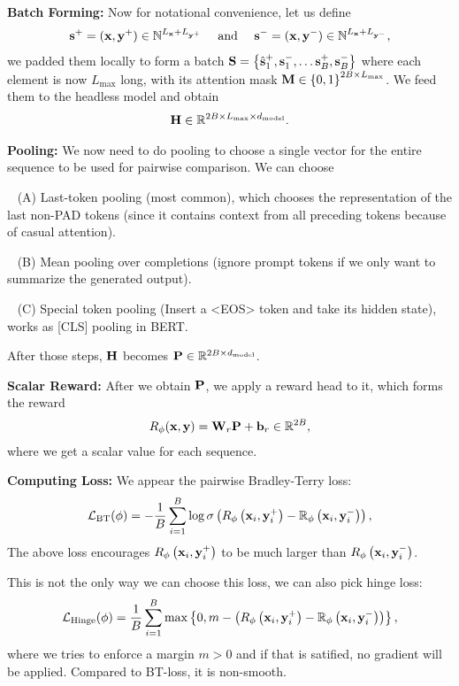 \documentclass[11pt]{article}  %
\begin{document}
\textbf{Batch Forming:} Now for notational convenience, let us define 
\begin{align*}
  \mathbf{s}^+ = (\mathbf{x}, \mathbf{y}^+) \in \mathbb{N}^{L_{\mathbf{x}} + L_{\mathbf{y}^+}} \quad \text{ and } \quad \mathbf{s}^- = (\mathbf{x}, \mathbf{y}^-) \in \mathbb{N}^{L_{\mathbf{x}} + L_{\mathbf{y}^-}},
\end{align*}
we padded them locally to form a batch $\mathbf{S} = \left\{ \hat{\mathbf{s}}_1^+, {\mathbf{s}}_1^-, \hdots {\mathbf{s}}_B^+, {\mathbf{s}}_B^- \right\}$ where each element is now $L_{\max}$ long, with its attention mask $\mathbf{M} \in \left\{ 0, 1 \right\}^{2B \times L_{\max}}$.
We feed them to the headless model and obtain 
\begin{align*}
  \mathbf{H} \in \mathbb{R}^{2B \times L_{\max} \times d_{\text{model}}}.
\end{align*}

\textbf{Pooling:} We now need to do pooling to choose a single vector for the entire sequence to be used for pairwise comparison. 
We can choose 

\textbullet~ (A) Last-token pooling (most common), which chooses the representation of the last non-PAD tokens (since it contains context from all preceding tokens because of casual attention). 

\textbullet~ (B) Mean pooling over completions (ignore prompt tokens if we only want to summarize the generated output).

\textbullet~ (C) Special token pooling (Insert a <EOS> token and take its hidden state), works as [CLS] pooling in BERT.

After those steps, $\mathbf{H}$ becomes $\mathbf{P} \in \mathbb{R}^{2B \times d_{\text{model}}}$.

\textbf{Scalar Reward:} After we obtain $\mathbf{P}$, we apply a reward head to it, which forms the reward 
\begin{align*}
  R_{\phi}(\mathbf{x}, \mathbf{y}) = \mathbf{W}_r \mathbf{P} + \mathbf{b}_r \in \mathbb{R}^{2B},
\end{align*}
where we get a scalar value for each sequence.

\textbf{Computing Loss:} We appear the pairwise Bradley-Terry loss: 
\begin{align*}
  \mathcal{L}_{\text{BT}}(\phi) = -\frac{1}{B}\sum_{i=1}^{B}\log \sigma\left( R_{\phi}\left( \mathbf{x}_i, \mathbf{y}_i^+ \right) - \mathbb{R}_\phi\left( \mathbf{x}_i, \mathbf{y}_i^- \right) \right),
\end{align*}
The above loss encourages $R_{\phi}\left( \mathbf{x}_i, \mathbf{y}_i^+ \right)$ to be much larger than $R_{\phi}\left( \mathbf{x}_i, \mathbf{y}_i^- \right)$.

This is not the only way we can choose this loss, we can also pick hinge loss:
\begin{align*}
  \mathcal{L}_{\text{Hinge}}(\phi) = \frac{1}{B}\sum_{i=1}^{B} \max\left\{ 0, m - \left( R_{\phi}\left( \mathbf{x}_i, \mathbf{y}_i^+ \right) - \mathbb{R}_\phi\left( \mathbf{x}_i, \mathbf{y}_i^- \right) \right) \right\},
\end{align*}
where we tries to enforce a margin $m > 0$ and if that is satified, no gradient will be applied.
Compared to BT-loss, it is non-smooth.
\end{document}
